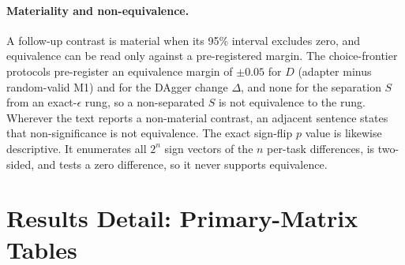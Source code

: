 \paragraph{Materiality and non-equivalence.}
A follow-up contrast is material when its 95\% interval excludes zero, and equivalence can be read only against a pre-registered margin. The choice-frontier protocols pre-register an equivalence margin of $\pm 0.05$ for $D$ (adapter minus random-valid M1) and for the DAgger change $\Delta$, and none for the separation $S$ from an exact-$\epsilon$ rung, so a non-separated $S$ is not equivalence to the rung. Wherever the text reports a non-material contrast, an adjacent sentence states that non-significance is not equivalence.
The exact sign-flip $p$ value is likewise descriptive. It enumerates all $2^n$ sign vectors of the $n$ per-task differences, is two-sided, and tests a zero difference, so it never supports equivalence.




\section{Results Detail: Primary-Matrix Tables}
\label{app:results-primary}
\label{sec:results-primary}

